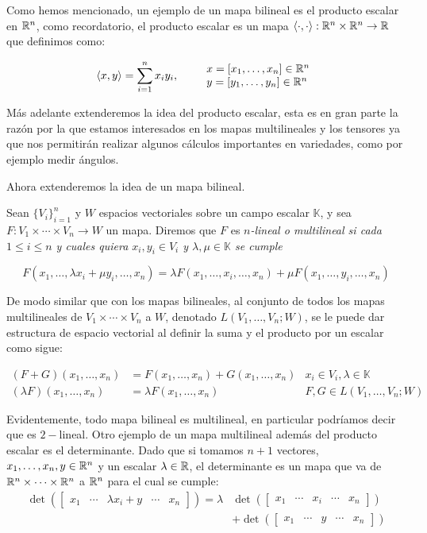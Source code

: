   Como hemos mencionado, un ejemplo de un mapa bilineal es el producto escalar en $\mathbb{R}^n$, como recordatorio, el producto escalar es un mapa $\langle \cdot , \cdot \rangle: \mathbb{R}^n \times \mathbb{R}^n \to \mathbb{R}$ que definimos como:

\[
  \langle x,y \rangle = \sum_{i=1}^{n} x_i y_i, \quad\quad
  \begin{array}{l}
  x=[x_1,\dots,x_n] \in \mathbb{R}^n\\
  y=[y_1,\dots,y_n] \in \mathbb{R}^n
  \end{array}
\] 

Más adelante extenderemos la idea del producto escalar, esta es en gran parte la razón por la que estamos interesados en los mapas multilineales y los tensores ya que nos permitirán realizar algunos cálculos importantes en variedades, como por ejemplo medir ángulos.

Ahora extenderemos la idea de un mapa bilineal.

\begin{definition}
  Sean $\{V_i\}_{i=1}^{n}$ y $W$ espacios vectoriales sobre un campo escalar $\mathbb{K}$, y  sea $F: V_1 \times \cdots \times V_n \to W$ un mapa. Diremos que $F$ es \it{$n$-lineal} o \it{multilineal} si cada $1 \leq i \leq n$ y cuales quiera $x_i,y_i \in V_i$ y $\lambda,\mu \in \mathbb{K}$ se cumple 

  \[ F(x_1, \dots, \lambda x_i + \mu y_i, \dots, x_n) = \lambda F(x_1, \dots, x_i, \dots, x_n) + \mu F(x_1, \dots, y_i, \dots, x_n) \]
\end{definition}

De modo similar que con los mapas bilineales, al conjunto de todos los mapas multilineales de $V_1 \times \cdots \times V_n$ a $W$, denotado $L(V_1, \ldots, V_n; W)$, se le puede dar estructura de espacio vectorial al definir la suma y el producto por un escalar como sigue:

\begin{align*}
  (F+G)(x_1,\ldots,x_n) &= F(x_1,\ldots,x_n) + G(x_1,\ldots,x_n) & x_i \in V_i, \lambda \in \mathbb{K}\\
  (\lambda F)(x_1,\ldots,x_n) &= \lambda F(x_1,\ldots,x_n) & F,G \in L(V_1,\ldots,V_n;W)
\end{align*}

  Evidentemente, todo mapa bilineal es multilineal, en particular podríamos decir que es $2-$lineal. Otro ejemplo de un mapa multilineal además del producto escalar es el determinante. Dado que si tomamos $n+1$ vectores, $x_1, \ldots, x_n, y \in \mathbb{R}^n$ y un escalar $\lambda \in \mathbb{R}$, el determinante es un mapa que va de $\mathbb{R}^n \times \cdots \times \mathbb{R}^n$ a $\mathbb{R}^n$ para el cual se cumple:
\begin{align*}
  \det(\begin{bmatrix}x_1 & \cdots & \lambda x_i + y & \cdots & x_n \end{bmatrix}) = \lambda &
  \det(\begin{bmatrix}x_1 & \cdots &x_i&\cdots& x_n \end{bmatrix})\\ 
    &+ \det(\begin{bmatrix}x_1 & \cdots & y & \cdots & x_n \end{bmatrix})
\end{align*}
